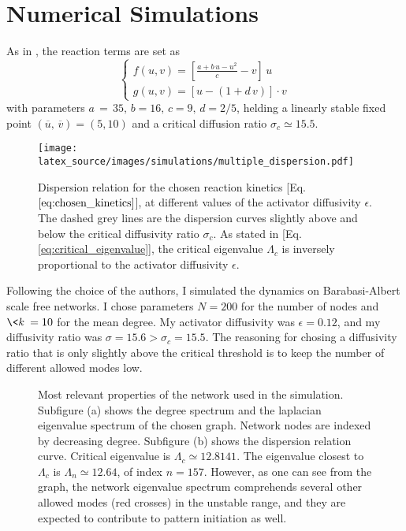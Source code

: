 \section{Numerical Simulations}
As in \cite{main_network}, the reaction terms are set as
\begin{equation}
    \begin{cases}
        f(u,v) = [\frac{a + b\,u -u^2}{c} - v]\, u \\
        g(u, v) = [u - (1+ d\,v)]\cdot v 
    \end{cases}
\label{eq:chosen_kinetics}
\end{equation}
with parameters $a\,=\,35,\, b=16,\, c= 9,\, d= 2/5$, 
helding a linearly stable fixed point $(\overline{u},\, \overline{v}) = (5, 10)$ and a critical diffusion ratio $\sigma_c \simeq 15.5$. \newline \noindent
\begin{figure}[H]
    \centering
    \texttt{[image: latex\_source/images/simulations/multiple\_dispersion.pdf]}
    \caption{Dispersion relation for the chosen reaction kinetics [Eq. $\ref{eq:chosen_kinetics}$], at different values of the activator diffusivity $\epsilon$. The dashed grey lines are the dispersion curves slightly above and below the critical diffusivity ratio $\sigma_c$. As stated in [Eq. \ref{eq:critical_eigenvalue}], the critical eigenvalue $\Lambda_c$ is inversely proportional to the activator diffusivity $\epsilon$.}
\end{figure}
Following the choice of the authors, I simulated the dynamics on Barabasi-Albert scale free networks. I chose parameters $N = 200$ for the number of nodes and $\<k\> = 10$ for the mean degree. My activator diffusivity was $\epsilon = 0.12$, and my diffusivity ratio was $\sigma = 15.6 > \sigma_c = 15.5$. The reasoning for chosing a diffusivity ratio that is only slightly above the critical threshold is to keep the number of different allowed modes low.
\begin{figure}[H]
\caption{Most relevant properties of the network used in the simulation. Subfigure (a) shows the degree spectrum and the laplacian eigenvalue spectrum of the chosen graph. Network nodes are indexed by decreasing degree. Subfigure (b) shows the dispersion relation curve. Critical eigenvalue is $\Lambda_c \simeq 12.8141$. The eigenvalue closest to $\Lambda_c$ is $\Lambda_n \simeq 12.64$, of index $n=157$. However, as one can see from the graph, the network eigenvalue spectrum comprehends several other allowed modes (red crosses) in the unstable range, and they are expected to contribute to pattern initiation as well.}
\end{figure}
